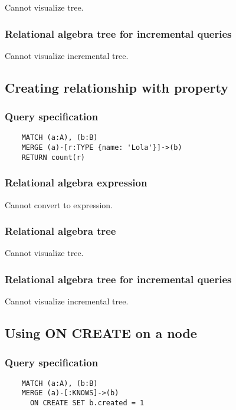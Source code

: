 	Cannot visualize tree.

	\subsubsection*{Relational algebra tree for incremental queries}

	Cannot visualize incremental tree.
	\subsection{Creating relationship with property}

	\subsubsection*{Query specification}

	\begin{lstlisting}
	MATCH (a:A), (b:B)
	MERGE (a)-[r:TYPE {name: 'Lola'}]->(b)
	RETURN count(r)
	\end{lstlisting}


	\subsubsection*{Relational algebra expression}

	Cannot convert to expression.

	\subsubsection*{Relational algebra tree}

	Cannot visualize tree.

	\subsubsection*{Relational algebra tree for incremental queries}

	Cannot visualize incremental tree.
	\subsection{Using ON CREATE on a node}

	\subsubsection*{Query specification}

	\begin{lstlisting}
	MATCH (a:A), (b:B)
	MERGE (a)-[:KNOWS]->(b)
	  ON CREATE SET b.created = 1
	\end{lstlisting}



